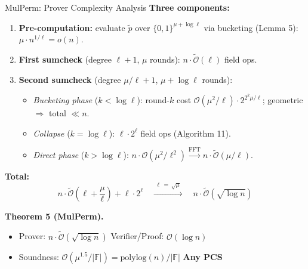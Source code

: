 \documentclass[aspectratio=169,10pt]{beamer}
\newcommand{\F}{\mathbb{F}}
\newcommand{\B}{\{0,1\}}
\newcommand{\wt}[1]{\widetilde{#1}}
\newcommand{\bigO}{\mathcal{O}}
\newcommand{\polylog}{\mathrm{polylog}}
\begin{document}
\begin{frame}{MulPerm: Prover Complexity Analysis}
\textbf{Three components:}
\begin{enumerate}
  \item \textbf{Pre-computation:} evaluate $\wt{p}$ over $\B^{\mu+\log\ell}$ via bucketing (Lemma 5): $\mu \cdot n^{1/\ell} = o(n)$.
  \item \textbf{First sumcheck} (degree $\ell+1$, $\mu$ rounds): $n \cdot \widetilde{\bigO}(\ell)$ field ops.
  \item \textbf{Second sumcheck} (degree $\mu/\ell + 1$, $\mu + \log\ell$ rounds):
  \begin{itemize}
    \item \textit{Bucketing phase} ($k < \log\ell$): round-$k$ cost $\bigO(\mu^2/\ell) \cdot 2^{2^k\mu/\ell}$; geometric $\Rightarrow$ total $\ll n$.
    \item \textit{Collapse} ($k = \log\ell$): $\ell \cdot 2^\ell$ field ops (Algorithm 11).
    \item \textit{Direct phase} ($k > \log\ell$): $n \cdot \bigO(\mu^2/\ell^2) \xrightarrow{\text{FFT}} n \cdot \widetilde{\bigO}(\mu/\ell)$.
  \end{itemize}
\end{enumerate}

\vspace{0.3em}
\textbf{Total:}
\[
  n \cdot \widetilde{\bigO}\!\left(\ell + \frac{\mu}{\ell}\right) + \ell \cdot 2^\ell
  \quad\xrightarrow{\;\ell\,=\,\sqrt{\mu}\;}\quad
  n \cdot \widetilde{\bigO}(\sqrt{\log n})
\]

\textbf{Theorem 5 (MulPerm).}
\begin{itemize}
  \item Prover: $n \cdot \widetilde{\bigO}(\sqrt{\log n})$ \quad Verifier/Proof: $\bigO(\log n)$
  \item Soundness: $\bigO(\mu^{1.5}/|\F|) = \polylog(n)/|\F|$ \quad \textbf{Any PCS}
\end{itemize}
\end{frame}

\end{document}
